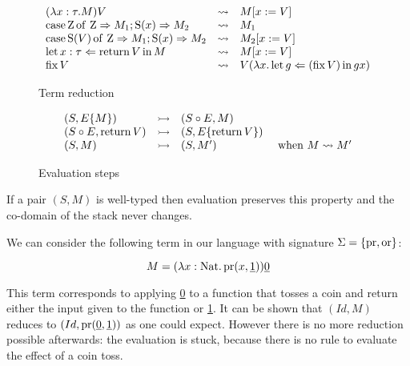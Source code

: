 \begin{figure}[h]
    \begin{center}
        \begin{equation*}
            \begin{array}{lcl}
                (\lambda x:\tau. M) V & \leadsto & M[x := V] \\
                \lcase{\Zero}{M_1}{M_2} & \leadsto & M_1 \\
                \lcase{\Succ(V)}{M_1}{M_2} & \leadsto & M_2[x := V] \\
                \Bind{\Ret V}{x : \tau}{M} & \leadsto & M[x := V] \\
                \Fix V & \leadsto & V (\lambda x. \Bind{(\Fix V)}{g}{g x})
            \end{array}
        \end{equation*}
    \end{center}
    \caption{Term reduction}
    \label{fig:termred}
\end{figure}


\begin{figure}[h]
    \begin{center}
        \begin{equation*}
            \begin{array}{lclr}
                (S,E\{M\}) & \reduces & (S \circ E, M) \\
                (S \circ E, \Ret V) & \reduces & (S, E \{ \Ret V \}) \\
                (S,M) & \reduces & (S,M') & \text{ when } M \leadsto M'
            \end{array}
        \end{equation*}
    \end{center}
    \caption{Evaluation steps}
    \label{fig:evalstep}
\end{figure}

\begin{alemma}[Safety]
    If a pair $(S,M)$ is well-typed then 
    evaluation preserves this property 
    and the co-domain of the stack never changes.
\end{alemma}

\begin{example}
    We can consider the following term in our language with signature $\Sigma =
    \{ \prEff, \orEff \}$:

    \begin{equation*}
        M = (\lambda x:\Nat. \prEff (x,\underline{1})) \underline{0}
    \end{equation*}
    
    This term corresponds to applying \underline{0} to a function 
    that tosses a coin and return either the input given to the 
    function or \underline{1}.
    It can be shown that $(Id,M)$ reduces to $(Id, \prEff (\underline{0},
    \underline{1}))$
    as one could expect. However there is no more reduction possible afterwards: the 
    evaluation is stuck, because there is no rule to evaluate 
    the effect of a coin toss.
\end{example}



